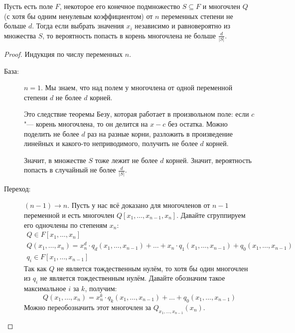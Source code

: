 	\begin{lemma}
		Пусть есть поле $F$, некоторое его конечное подмножество $S \subseteq F$ и многочлен $Q$ (с хотя бы одним ненулевым коэффициентом) от $n$ переменных степени не больше $d$.
		Тогда если выбрать значения $x_i$ независимо и равновероятно из множества $S$, то вероятность попасть в корень многочлена не больше $\frac{d}{|S|}$.
	\end{lemma}
	\begin{proof}
		Индукция по числу переменных $n$.
		\begin{description}
			\item[База:] $n=1$.
				Мы знаем, что над полем у многочлена от одной переменной степени $d$ не более $d$ корней.
				\begin{Rem}
					Это следствие теоремы Безу, которая работает в произвольном поле: если $c$ "--- корень многочлена, то он делится на $x-c$ без остатка.
					Можно поделить не более $d$ раз на разные корни, разложить в произведение линейных и какого-то неприводимого,
					получить не более $d$ корней.
				\end{Rem}
				Значит, в множестве $S$ тоже лежит не более $d$ корней.
				Значит, вероятность попасть в случайный не более $\frac{d}{|S|}$.
			\item[Переход:] $(n-1) \to n$.
				Пусть у нас всё доказано для многочленов от $n-1$ переменной и есть многочлен $Q[x_1, \dots, x_{n-1}, x_n]$.
				Давайте сгруппируем его одночлены по степеням $x_n$:
				\begin{gather*}
					Q \in F[x_1, \dots, x_n] \\
					Q(x_1, \dots, x_n) = x_n^d \cdot q_d(x_1, \dots, x_{n-1}) + \dots + x_n \cdot q_1(x_1, \dots, x_{n-1}) + q_0(x_1, \dots, x_{n-1}) \\
					q_i \in F[x_1, \dots, x_{n-1}]
				\end{gather*}
				Так как $Q$ не является тождественным нулём, то хотя бы один многочлен из $q_i$ не является тождественным нулём.
				Давайте обозначим такое максимальное $i$ за $k$, получим:
				\[
					Q(x_1, \dots, x_n) = x_n^k \cdot q_k(x_1, \dots, x_{n-1}) + \dots + q_0(x_1, \dots, x_{n-1})
				\]
				Можно переобозначить этот многочлен за $Q_{x_1,\dots, x_{n-1}}(x_n)$.


\end{description}
\end{proof}
